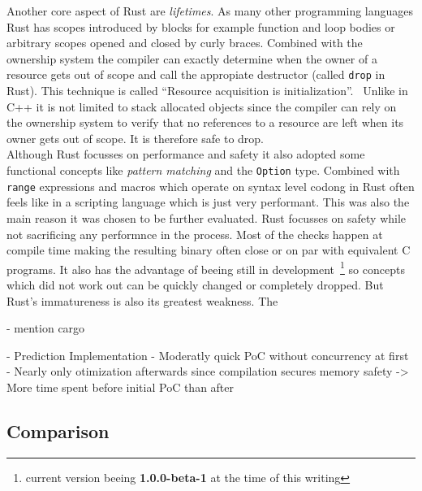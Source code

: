 Another core aspect of Rust are \textit{lifetimes}. As many other programming languages Rust has scopes introduced by blocks for example function and loop bodies or arbitrary scopes opened and closed by curly braces. Combined with the ownership system the compiler can exactly determine when the owner of a resource gets out of scope and call the appropiate destructor (called \lstinline$drop$ in Rust). This technique is called ``Resource acquisition is initialization''.~\cite[p. 389]{evolution_c++} Unlike in C++ it is not limited to stack allocated objects since the compiler can rely on the ownership system to verify that no references to a resource are left when its owner gets out of scope. It is therefore safe to drop.
\\


Although Rust focusses on performance and safety it also adopted some functional concepts like \textit{pattern matching} and the \lstinline$Option$ type. Combined with \lstinline$range$ expressions and macros which operate on syntax level codong in Rust often feels like in a scripting language which is just very performant. This was also the main reason it was chosen to be further evaluated. Rust focusses on safety while not sacrificing any performnce in the process. Most of the checks happen at compile time making the resulting binary often close or on par with equivalent C programs. It also has the advantage of beeing still in development~\footnote{current version beeing \textbf{1.0.0-beta-1} at the time of this writing} so concepts which did not work out can be quickly changed or completely dropped.
But Rust's immatureness is also its greatest weakness. The

- mention cargo

- Prediction Implementation
    - Moderatly quick PoC without concurrency at first
    - Nearly only otimization afterwards since compilation secures memory safety
    -> More time spent before initial PoC than after


\subsection*{Comparison}
\label{subsec:State_of_the_art::Candidates::Comparison}

